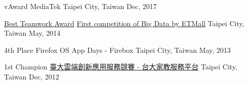 

\begin{cvhonors}

  \cvhonor
    {vAward} %
    {MediaTek} %
    {Taipei City, Taiwan} %
    {Dec, 2017} %

  \cvhonor
    {\href{https://www.slideshare.net/evenchange4/cb102-baeir}{Best Teamwork Award}} %
    {\href{https://www.ettoday.net/events/bigdata2014/rules.php}{First competition of Big Data by ETMall}} %
    {Taipei City, Taiwan} %
    {May, 2014} %

  \cvhonor
    {4th Place} %
    {Firefox OS App Days - Firebox} %
    {Taipei City, Taiwan} %
    {May, 2013} %

  \cvhonor
    {1st Champion} %
    {\href{https://www.bnext.com.tw/article/25872/BN-ARTICLE-25872}{臺大雲端創新應用服務競賽 - 台大家教服務平台}} %
    {Taipei City, Taiwan} %
    {Dec, 2012} %

\end{cvhonors}
